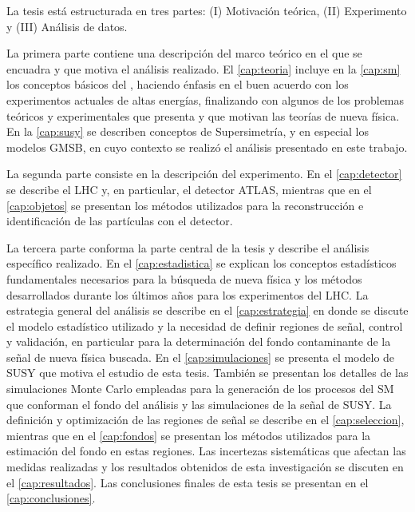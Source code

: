 La tesis está estructurada en tres partes: (I) Motivación teórica, (II) Experimento
y (III) Análisis de datos.

La primera parte contiene una descripción del marco teórico en
el que se encuadra y que motiva el análisis realizado. El \cref{cap:teoria} incluye en la
\cref{cap:sm} los conceptos básicos del {\SM}, haciendo énfasis en el buen
acuerdo con los experimentos actuales de altas energías, finalizando con algunos
de los problemas teóricos y experimentales que presenta y que motivan las
teorías de nueva física. En la \cref{cap:susy} se describen conceptos de
Supersimetría, y en especial los modelos GMSB, en cuyo contexto se realizó el
análisis presentado en este trabajo.

La segunda parte consiste en la descripción del experimento. En el
\cref{cap:detector} se describe el LHC y, en particular, el detector ATLAS,
mientras que en el \cref{cap:objetos} se presentan los métodos utilizados para
la reconstrucción e identificación de las partículas con el detector.

La tercera parte conforma la parte central de la tesis y describe el análisis
específico realizado. En el \cref{cap:estadistica} se explican los conceptos
estadísticos fundamentales necesarios para la búsqueda de nueva física y los
métodos desarrollados durante los últimos a\~nos para los experimentos del LHC.
La estrategia general del análisis se describe en el \cref{cap:estrategia} en
donde se discute el modelo estadístico utilizado y la necesidad de definir
regiones de señal, control y validación, en particular para la determinación del
fondo contaminante de la señal de nueva física buscada.
En el \cref{cap:simulaciones} se presenta el modelo de SUSY que motiva el
estudio de esta tesis. También se presentan los detalles de las simulaciones
Monte Carlo empleadas para la generación de los procesos del SM que conforman el
fondo del análisis y las simulaciones de la señal de SUSY.
La definición y optimización de las regiones de señal se describe en el
\cref{cap:seleccion}, mientras que en el \cref{cap:fondos} se presentan los
métodos utilizados para la estimación del fondo en estas regiones.
Las incertezas sistemáticas que afectan las medidas
realizadas y los resultados obtenidos de esta investigación se discuten en el
\cref{cap:resultados}. Las conclusiones finales de esta tesis se presentan en el
\cref{cap:conclusiones}.
